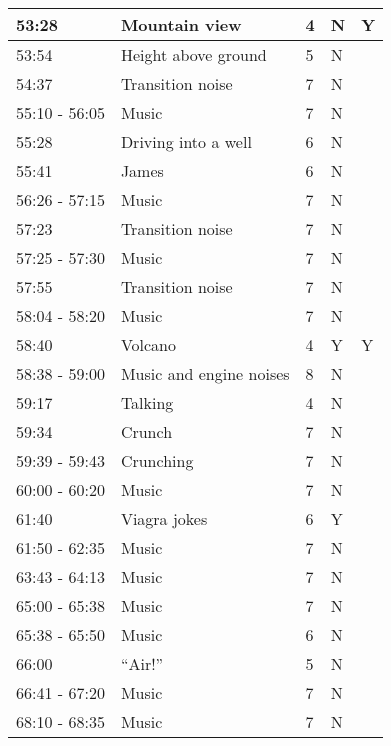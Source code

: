 \begin{longtable}{| p{70pt} | p{130pt} | p{45pt} | p{57pt} | p{60pt}|}
53:28     &     Mountain view     &     4     &     N&Y \\\hline
53:54     &     Height above ground     &     5     &     N& \\\hline
54:37     &     Transition noise     &     7     &     N& \\\hline
55:10 - 56:05     &     Music     &     7     &     N& \\\hline
55:28     &     Driving into a well     &     6     &     N& \\\hline
55:41     &     James     &     6     &     N& \\\hline
56:26 - 57:15     &     Music     &     7     &     N& \\\hline
57:23     &     Transition noise     &     7     &     N& \\\hline
57:25 - 57:30     &     Music     &     7     &     N& \\\hline
57:55     &     Transition noise     &     7     &     N& \\\hline
58:04 - 58:20     &     Music     &     7     &     N& \\\hline
58:40     &     Volcano     &     4     &     Y&Y \\\hline
58:38 - 59:00     &     Music and engine noises     &     8     &     N& \\\hline
59:17     &     Talking     &     4     &     N& \\\hline
59:34     &     Crunch     &     7     &     N& \\\hline
59:39 - 59:43     &     Crunching     &     7     &     N& \\\hline
60:00 - 60:20     &     Music     &     7     &     N& \\\hline
61:40     &     Viagra jokes     &     6     &     Y& \\\hline
61:50 - 62:35     &     Music     &     7     &     N& \\\hline
63:43 - 64:13     &     Music     &     7     &     N& \\\hline
65:00 - 65:38     &     Music     &     7     &     N& \\\hline
65:38 - 65:50     &     Music     &     6     &     N& \\\hline
66:00     &     ``Air!''     &     5     &     N& \\\hline
66:41 - 67:20     &     Music     &     7     &     N& \\\hline
68:10 - 68:35     &     Music     &     7     &     N& \\\hline

\end{longtable}
